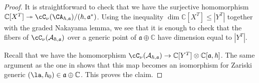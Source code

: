 \documentclass[12pt]{amsart}
\begin{document}
\begin{proof}
It is straightforward to check that we have the surjective homomorphism $\mathbb{C}[X^{T}] \twoheadrightarrow \cC_{\nu}(\CA_{\hbar,\mathfrak{a}})/(\hbar,\mathfrak{a}^*)$. Using the inequality $\operatorname{dim}\mathbb{C}[X^{T}] \leqslant |Y^{T}|$ together with the graded Nakayama lemma, we see that it is enough to check that the fibers of $\cC_\nu(\mathcal{A}_{\hbar,\mathfrak{a}})$ over a generic point of $\mathfrak{a} \oplus \mathbb{C}$ have dimension equal to $|Y^{T}|$. 


Recall that we have the homomorphism $\cC_\nu(\mathcal{A}_{\hbar,\mathfrak{a}}) \rightarrow \mathbb{C}[Y^T] \otimes \mathbb{C}[\mathfrak{a},\hbar]$. The same argument as the one in \cite[Proposition 5.3]{LosevCatO} shows that this map becomes an isomorphism for Zariski generic $(\la,\hbar_0) \in \mathfrak{a} \oplus \mathbb{C}$. This proves the claim.
\end{proof}


\end{document}
